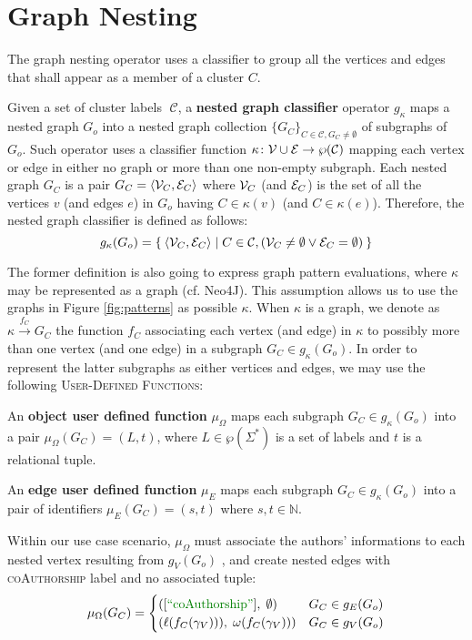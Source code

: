\section{Graph Nesting}\label{sec:nestingdef}
The graph nesting operator uses a classifier to group all the vertices and edges that shall appear as a member of a cluster $C$. 

\begin{definition}
	Given a set of cluster labels $\;\mathcal{C}$, a \textbf{nested graph classifier} operator $g_\kappa$ maps a nested graph $G_o$ into a nested  graph collection $\{G_C\}_{C\in\mathcal{C},G_C\neq \emptyset}$ of subgraphs of $G_o$. Such operator uses a classifier function $\kappa\colon \mathcal{V}\cup \mathcal{E}\to \wp(\mathcal{C})$ mapping each vertex or edge in either no graph or more than one non-empty subgraph. Each nested graph $G_C$ is a pair
	$G_C=\Braket{\mathcal{V}_C,\mathcal{E}_C}$
	where $\mathcal{V}_C$ (and $\mathcal{E}_C$) is the set of all the vertices $v$ (and edges $e$) in $G_o$ having $C\in \kappa(v)$ (and $C\in \kappa(e)$). Therefore, the nested graph classifier is defined as follows:
	\[g_\kappa(G_o)=\Set{\Braket{\mathcal{V}_C,\mathcal{E}_C}|C\in\mathcal{C},(\mathcal{V}_C\neq\emptyset\vee\mathcal{E}_C=\emptyset)}\]
\end{definition}

The former definition is also going to express graph pattern evaluations, where $\kappa$ may be represented as a graph (cf. Neo4J). This assumption allows us to use the graphs in Figure \ref{fig:patterns} as possible $\kappa$. When $\kappa$ is a graph, we denote as $\kappa\xrightarrow{f_C} G_C$ the function $f_C$ associating  each vertex (and edge) in $\kappa$ to possibly more than one vertex (and one edge) in a subgraph $G_C\in g_\kappa(G_o)$. In order to represent the latter subgraphs  as either vertices and edges, we may use
the following \textsc{User-Defined Functions}:
\begin{definition}
	An \textbf{object user defined function} $\mu_\Omega$ maps each subgraph $G_C\in g_\kappa(G_o)$ into a pair $\mu_\Omega(G_C)=(L,t)$, where $L\in\wp(\Sigma^*)$ is a set of labels and $t$ is a relational tuple.
	
	An \textbf{edge user defined function} $\mu_E$ maps each subgraph $G_C\in g_\kappa(G_o)$ into a pair of identifiers $\mu_E(G_C)=(s,t)$ where $s,t\in\mathbb{N}$.
\end{definition}

\begin{ex}
Within our use case scenario, $\mu_\Omega$  must associate  the authors' informations to each nested vertex resulting from $g_{V}(G_{o})$ , and create nested edges with \textsc{coAuthorship} label and no associated tuple:
\[\mu_\Omega(G_C)=\begin{cases}
([\mstr{coAuthorship}],\;\emptyset) & G_C \in g_E(G_{o})\\
(\ell(f_C(\gamma_V))),\;\omega(f_C(\gamma_V))) & G_C \in g_V(G_{o})\\
\end{cases}\]
\end{ex}

